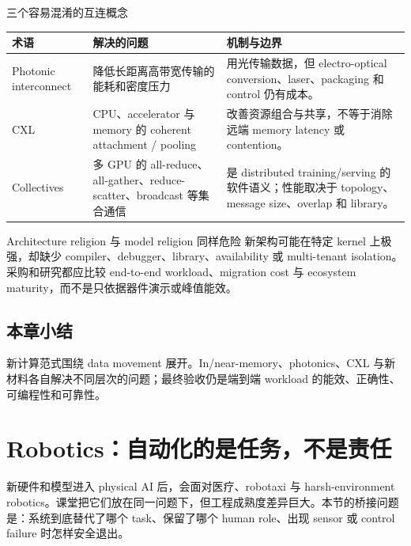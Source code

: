 \documentclass[a4paper]{article}
\begin{document}
\begin{knowledgebox}{三个容易混淆的互连概念}
\begin{tabularx}{\textwidth}{L{0.19\textwidth}L{0.25\textwidth}X}
\toprule
术语 & 解决的问题 & 机制与边界 \\
\midrule
Photonic interconnect & 降低长距离高带宽传输的能耗和密度压力 & 用光传输数据，但 electro-optical conversion、laser、packaging 和 control 仍有成本。 \\
CXL & CPU、accelerator 与 memory 的 coherent attachment / pooling & 改善资源组合与共享，不等于消除远端 memory latency 或 contention。 \\
Collectives & 多 GPU 的 all-reduce、all-gather、reduce-scatter、broadcast 等集合通信 & 是 distributed training/serving 的软件语义；性能取决于 topology、message size、overlap 和 library。 \\
\bottomrule
\end{tabularx}
\end{knowledgebox}

\begin{warningbox}{Architecture religion 与 model religion 同样危险}
新架构可能在特定 kernel 上极强，却缺少 compiler、debugger、library、availability 或 multi-tenant isolation。采购和研究都应比较 end-to-end workload、migration cost 与 ecosystem maturity，而不是只依据器件演示或峰值能效。
\end{warningbox}


\subsection{本章小结}

新计算范式围绕 data movement 展开。In/near-memory、photonics、CXL 与新材料各自解决不同层次的问题；最终验收仍是端到端 workload 的能效、正确性、可编程性和可靠性。

\section{Robotics：自动化的是任务，不是责任}

新硬件和模型进入 physical AI 后，会面对医疗、robotaxi 与 harsh-environment robotics。课堂把它们放在同一问题下，但工程成熟度差异巨大。本节的桥接问题是：系统到底替代了哪个 task、保留了哪个 human role、出现 sensor 或 control failure 时怎样安全退出。
\end{document}
